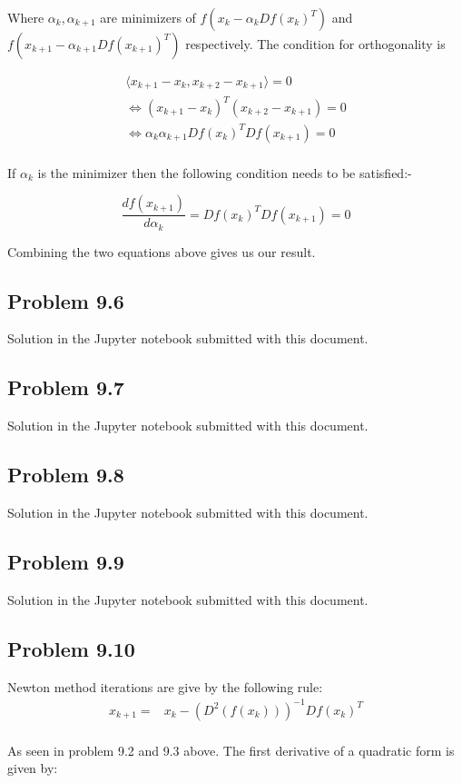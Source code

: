 \documentclass[letterpaper,12pt]{article}
\theoremstyle{definition}
\begin{document}
\begin{flushleft}
Where $\alpha_k,\alpha_{k+1} $ are minimizers of $f(x_k - \alpha_k  Df(x_k)^T )$ and $f(x_{k+1} - \alpha_{k+1} Df(x_{k+1})^T)$ respectively.
\vspace{2mm}
The condition for orthogonality is
\end{flushleft}

\begin{align*}
    \langle x_{k+1} -x_k,x_{k+2} -x_{k+1}\rangle = 0\\
    \iff (x_{k+1} -x_k)^T(x_{k+2} -x_{k+1}) = 0\\
    \iff \alpha_k \alpha_{k+1}Df(x_k)^TDf(x_{k+1})= 0\\
\end{align*}

\begin{flushleft}
If $\alpha_k$ is the minimizer then the following condition needs to be satisfied:-
\end{flushleft}
\begin{equation*}
    \frac{d f(x_{k+1}) }{d \alpha_k}  = Df(x_k)^TDf(x_{k+1}) = 0 
\end{equation*}

\begin{flushleft}
Combining the two equations above gives us our result.
\end{flushleft}


\subsection*{Problem 9.6}


Solution in the Jupyter notebook submitted with this document.
\subsection*{Problem 9.7}
Solution in the Jupyter notebook submitted with this document.
\subsection*{Problem 9.8}
Solution in the Jupyter notebook submitted with this document.
\subsection*{Problem 9.9}
Solution in the Jupyter notebook submitted with this document.
\subsection*{Problem 9.10}
Newton method iterations are give by the following rule:
\begin{align*}
   x_{k+1}=& x_{k} - (D^2 (f(x_{k})))^{-1} Df(x_{k})^T \\
\end{align*}
\begin{flushleft}
As seen in problem 9.2 and 9.3 above. The first derivative of a quadratic form is given by:
\end{flushleft}
\end{document}
